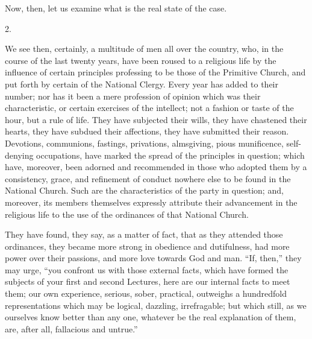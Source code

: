 Now, then, let us examine what is the real state of the case.

2.

We see then, certainly, a multitude of men all over the country,
who, in the course of the last twenty years, have been roused to a
religious life by the influence of certain principles professing to be
those of the Primitive Church, and put forth by certain of the
National Clergy. Every year has added to their number; nor has it been
a mere profession of opinion which was their characteristic, or
certain exercises of the intellect; not a fashion or taste of the
hour, but a rule of life. They have subjected their wills, they have
chastened their hearts, they have subdued their affections, they have
submitted their reason. Devotions, communions, fastings, privations,
almsgiving, pious munificence, self-denying occupations, have marked
the spread of the principles in question; which have, moreover, been
adorned and recommended in those who adopted them by a consistency,
grace, and refinement of conduct nowhere else to be found in the
National Church. Such are the characteristics of the party in
question; and, moreover, its members themselves expressly attribute
their advancement in the religious life to the use of the ordinances
of that National Church.

They have found, they say, as a matter of fact, that as they
attended those ordinances, they became more strong in obedience and
dutifulness, had more power over their passions, and more love towards
God and man. ``If, then,'' they may urge, ``you confront
us with those external facts, which have formed the subjects of your
first and second Lectures, here are our internal facts to meet them;
our own experience, serious, sober, practical, outweighs a hundredfold
representations which may be logical, dazzling, irrefragable; but
which still, as we ourselves know better than any one, whatever be the
real explanation of them, are, after all, fallacious and untrue.''

